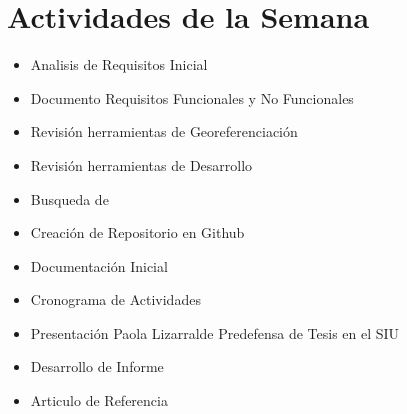 \section{Actividades de la Semana}


\begin{itemize}

\item Analisis de Requisitos Inicial

\item Documento Requisitos Funcionales y No Funcionales

\item Revisión herramientas de Georeferenciación

\item Revisión herramientas de Desarrollo 

\item Busqueda de 

\item Creación de Repositorio en Github

\item Documentación Inicial

\item Cronograma de Actividades

\item Presentación Paola Lizarralde Predefensa de Tesis en el SIU

\item Desarrollo de Informe

\item Articulo de Referencia\cite{scavuzzoalgoritmos}

\end{itemize}
